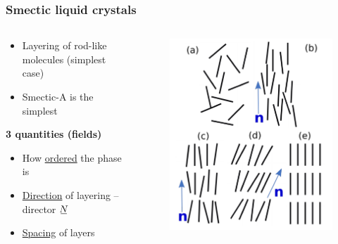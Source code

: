 \documentclass[10pt,mathserif]{beamer}
\begin{document}
\begin{frame}
    \frametitle{Smectic liquid crystals}
    \begin{columns}
        \begin{column}{0.49\textwidth}
            \begin{itemize}
                \setlength\itemsep{1ex}
                \item Layering of rod-like molecules \color{gray} (simplest case) \normalcolor
                \item Smectic-A is the simplest
            \end{itemize}
            \vspace{2em}
            \begin{center}
                \large \bf 3 quantities \color{gray} (fields) \normalcolor
            \end{center}
            \vspace{1ex}
            \begin{itemize}
                \setlength\itemsep{1ex}
                \item How \underline{ordered} the phase is
                \item \underline{Direction} of layering -- director $\su{N}$
                \item \underline{Spacing} of layers
            \end{itemize}
        \end{column}
        \begin{column}{0.49\textwidth}
            \begin{figure}
                \centering
                \includegraphics[width=\textwidth]{figures/phases.pdf}

\end{figure}
\end{column}
\end{columns}
\end{frame}
\end{document}
